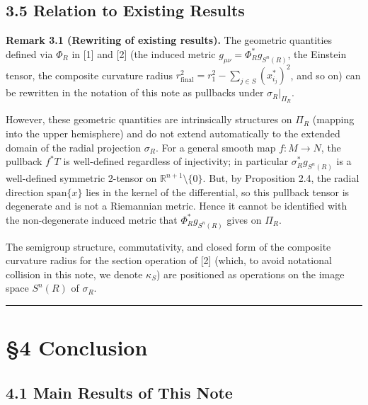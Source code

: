 \documentclass[
]{ltjsarticle}
\begin{document}
\subsection{3.5 Relation to Existing
Results}\label{relation-to-existing-results}

\textbf{Remark 3.1 (Rewriting of existing results).} The geometric
quantities defined via \(\Phi_R\) in {[}1{]} and {[}2{]} (the induced
metric \(g_{\mu\nu} = \Phi_R^* g_{S^n(R)}\), the Einstein tensor, the
composite curvature radius
\(r_{\text{final}}^2 = r_1^2 - \sum_{j \in S}(x_{i_j}^*)^2\), and so on)
can be rewritten in the notation of this note as pullbacks under
\(\sigma_R \big|_{\Pi_R}\).

However, these geometric quantities are intrinsically structures on
\(\Pi_R\) (mapping into the upper hemisphere) and do not extend
automatically to the extended domain of the radial projection
\(\sigma_R\). For a general smooth map \(f: M \to N\), the pullback
\(f^* T\) is well-defined regardless of injectivity; in particular
\(\sigma_R^* g_{S^n(R)}\) is a well-defined symmetric 2-tensor on
\(\mathbb{R}^{n+1} \setminus \{0\}\). But, by Proposition 2.4, the
radial direction \(\mathrm{span}\{x\}\) lies in the kernel of the
differential, so this pullback tensor is degenerate and is not a
Riemannian metric. Hence it cannot be identified with the non-degenerate
induced metric that \(\Phi_R^* g_{S^n(R)}\) gives on \(\Pi_R\).

The semigroup structure, commutativity, and closed form of the composite
curvature radius for the section operation of {[}2{]} (which, to avoid
notational collision in this note, we denote \(\kappa_S\)) are
positioned as operations on the image space \(S^n(R)\) of \(\sigma_R\).

\begin{center}\rule{0.5\linewidth}{0.5pt}\end{center}

\section{§4 Conclusion}\label{conclusion}

\subsection{4.1 Main Results of This
Note}\label{main-results-of-this-note}
\end{document}
